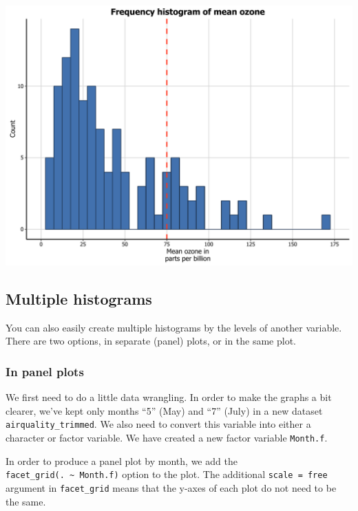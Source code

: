 \documentclass[]{article}
\begin{document}
\begin{center}\includegraphics{0_all_posts_pdf/histogram_17-1} \end{center}

\subsection{Multiple histograms}\label{multiple-histograms}

You can also easily create multiple histograms by the levels of another
variable. There are two options, in separate (panel) plots, or in the
same plot.

\subsubsection{In panel plots}\label{in-panel-plots}

We first need to do a little data wrangling. In order to make the graphs
a bit clearer, we've kept only months ``5'' (May) and ``7'' (July) in a
new dataset \texttt{airquality\_trimmed}. We also need to convert this
variable into either a character or factor variable. We have created a
new factor variable \texttt{Month.f}.

In order to produce a panel plot by month, we add the
\texttt{facet\_grid(.\ \textasciitilde{}\ Month.f)} option to the plot.
The additional \texttt{scale\ =\ free} argument in \texttt{facet\_grid}
means that the y-axes of each plot do not need to be the same.
\end{document}
